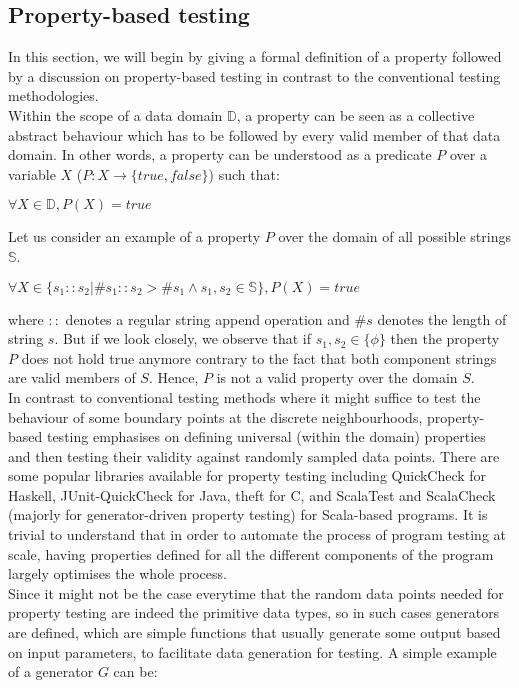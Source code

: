 
\newcommand{\avector}[2]{(#1_1,#1_2,\ldots,#1_{#2})}
\newcommand{\aDEFvector}[2][a]{(#1_1,#1_2,\ldots,#1_{#2})}

\subsection{Property-based testing}
In this section, we will begin by giving a formal definition of a property followed by a discussion on property-based testing in contrast to the conventional testing methodologies.\\
Within the scope of a data domain $\mathbb{D}$, a property can be seen as a collective abstract behaviour which has to be followed by every valid member of that data domain. In other words, a property can be understood as a predicate $P$ over a variable $X$ ($P:X \rightarrow \{true, false\}$) such that: 
\begin{center}
$\forall X \in \mathbb{D}, P(X) = true$
\end{center}
Let us consider an example of a property $P$ over the domain of all possible strings $\mathbb{S}$.
\begin{center}
$\forall X \in \{s_1::s_2 | \#s_1::s_2 >  \#s_1 \wedge s_1, s_2 \in \mathbb{S}\}, P(X) = true$
\end{center}
where $::$ denotes a regular string append operation and $\#s$ denotes the length of string $s$. But if we look closely, we observe that if $s_1, s_2 \in \{\phi\}$ then the property $P$ does not hold true anymore contrary to the fact that both component strings are valid members of $S$. Hence, $P$ is not a valid property over the domain $S$. \\
In contrast to conventional testing methods where it might suffice to test the behaviour of some boundary points at the discrete neighbourhoods, property-based testing emphasises on defining universal (within the domain) properties and then testing their validity against randomly sampled data points. There are some popular libraries available for property testing including QuickCheck for Haskell, JUnit-QuickCheck for Java, theft for C, and ScalaTest and ScalaCheck (majorly for generator-driven property testing) for Scala-based programs. It is trivial to understand that in order to automate the process of program testing at scale, having properties defined for all the different components of the program largely optimises the whole process. \\
Since it might not be the case everytime that the random data points needed for property testing are indeed the primitive data types, so in such cases generators are defined, which are simple functions that usually generate some output based on input parameters, to facilitate data generation for testing. A simple example of a generator $G$ can be:
